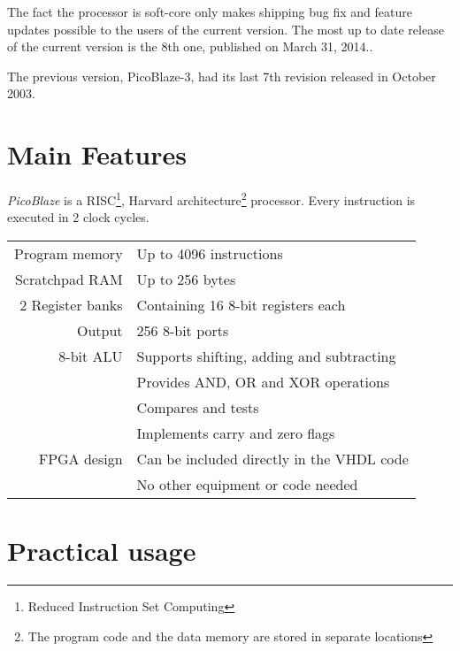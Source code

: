 The fact the processor is soft-core only makes shipping bug fix and feature updates possible to the users of the current version. The most up to date release of the current version is the 8th one, published on March 31, 2014..

The previous version, PicoBlaze-3, had its last 7th revision released in October 2003. 

    \section{Main Features}

    \emph{PicoBlaze} is a RISC\footnote{Reduced Instruction Set Computing}, Harvard architecture\footnote{The program code and the data memory are stored in separate locations} processor. Every instruction is executed in 2 clock cycles.

    \begin{center}
    \begin{tabular}{ @{\extracolsep{\fill} } r | l }
        Program memory & Up to 4096 instructions \\

        Scratchpad RAM & Up to 256 bytes \\

        2 Register banks & Containing 16 8-bit registers each\\

        Output & 256 8-bit ports \\

        8-bit ALU & Supports shifting, adding and subtracting \\
                  & Provides AND, OR and XOR operations \\
                  & Compares and tests \\
                  & Implements carry and zero flags \\

        FPGA design & Can be included directly in the VHDL code \\
                    & No other equipment or code needed \\
    \end{tabular}
    \end{center}

    \section{Practical usage}

